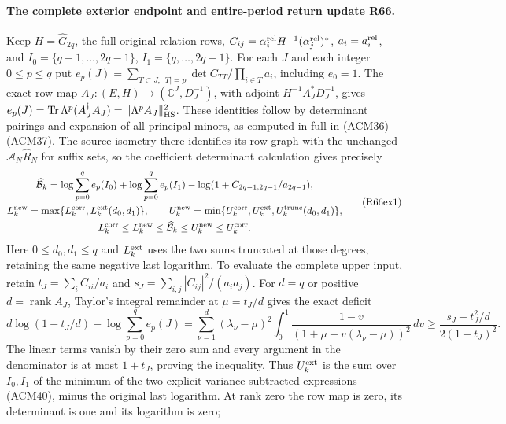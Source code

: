 \paragraph{The complete exterior endpoint and entire-period return update R66.}
Keep $H=\widehat G_{2q}$, the full original relation rows,
$C_{ij}=\alpha_i^{\rm rel}H^{-1}(\alpha_j^{\rm rel})^*$,
$a_i=a_i^{\rm rel}$, and $I_0=\{q-1,\ldots,2q-1\}$,
$I_1=\{q,\ldots,2q-1\}$. For each $J$ and each integer
$0\leq p\leq q$ put
$e_p(J)=\sum_{T\subset J,\ |T|=p}\det C_{TT}/\prod_{i\in T}a_i$,
including $e_0=1$. The exact row map
$A_J:(E,H)\to(\mathbb C^J,D_J^{-1})$, with adjoint
$H^{-1}A_J^*D_J^{-1}$, gives
$e_p(J)=\operatorname{Tr}\Lambda^p(A_J^\dagger A_J)
=\|\Lambda^pA_J\|_{\rm HS}^2$.
These identities follow by determinant pairings and expansion
of all principal minors, as computed in full in (ACM36)--(ACM37).
The source isometry there identifies its row graph with the
unchanged $\mathcal A_N\widehat R_N$ for suffix sets, so the
coefficient determinant calculation gives precisely
\[
\begin{gathered}
 \widehat{\mathcal B}_k=
 \log\sum_{p=0}^q e_p(I_0)+\log\sum_{p=0}^q e_p(I_1)
                    -\log(1+C_{2q-1,2q-1}/a_{2q-1}),\\
 L_k^{\rm new}=\max\{L_k^{\rm corr},L_k^{\rm ext}(d_0,d_1)\},
 \qquad U_k^{\rm new}=\min\{U_k^{\rm corr},U_k^{\rm ext},
                                      U_k^{\rm trunc}(d_0,d_1)\},\\
 L_k^{\rm corr}\leq L_k^{\rm new}
       \leq\widehat{\mathcal B}_k
       \leq U_k^{\rm new}\leq U_k^{\rm corr}.
\end{gathered}\tag{R66ex1}
\]
Here $0\leq d_0,d_1\leq q$ and
$L_k^{\rm ext}$ uses the two sums truncated at those degrees,
retaining the same negative last logarithm.
To evaluate the complete upper input, retain
$t_J=\sum_iC_{ii}/a_i$ and
$s_J=\sum_{i,j}|C_{ij}|^2/(a_i a_j)$.
For $d=q$ or positive $d=\operatorname{rank}A_J$, Taylor's
integral remainder at $\mu=t_J/d$ gives the exact deficit
\[
 d\log(1+t_J/d)-\log\sum_{p=0}^qe_p(J)
 =\sum_{\nu=1}^d(\lambda_\nu-\mu)^2
   \int_0^1\frac{1-v}{(1+\mu+v(\lambda_\nu-\mu))^2}\,dv
 \geq\frac{s_J-t_J^2/d}{2(1+t_J)^2}.
 \tag{R66ex2}
\]
The linear terms vanish by their zero sum and every argument
in the denominator is at most $1+t_J$, proving the inequality.
Thus $U_k^{\rm ext}$ is the sum over $I_0,I_1$ of the minimum
of the two explicit variance-subtracted expressions (ACM40),
minus the original last logarithm. At rank zero the row map
is zero, its determinant is one and its logarithm is zero;
